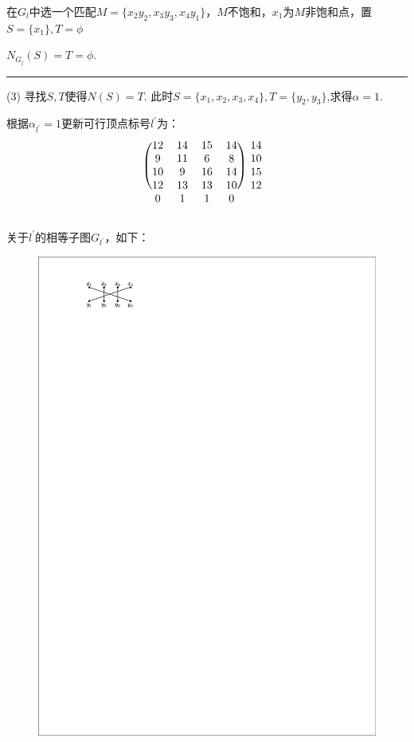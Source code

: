 \begin{example}
在$G_l$中选一个匹配$M=\{x_2y_2,x_3y_3,x_4y_1\}$，$M$不饱和，$x_1$为$M$非饱和点，置$S=\{x_1\}, T=\phi$

$N_{G_{\hat{l}}}(S)=T=\phi$.

{\noindent}\textcolor{red}{}

{\noindent}	 \rule[0pt]{\textwidth}{0.05em}


\noindent(3) 寻找$S, T$使得$N(S)=T$. 此时$S=\{x_1,x_2,x_3,x_4\}, T=\{y_2, y_3\}$,求得$\alpha=1$.

根据$\alpha_{l^{'}}=1$更新可行顶点标号$l^{'}$为：
	\[
\begin{blockarray}{ccccc}
	\begin{block}{(cccc)c}
		12&14&15&14&14\\
		9&11&6&8&10\\
		10&9&16&14&15\\
		12&13&13&10&12\\
	\end{block}
	0&1&1&0&
\end{blockarray}
\]

关于${l^{'}}$的相等子图$G_{l^{'}}$，如下：
\begin{figure}[H]
	\small
	\centering 
	\includegraphics[scale=1.2]{image/CH5_zuiyoupipei3.pdf}  
	\label{fikgksjjl1KKk}  
\end{figure}


\end{example}
